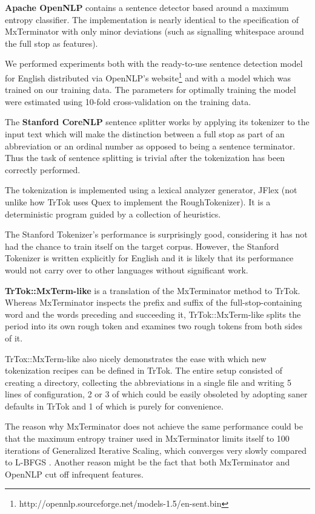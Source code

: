 \textbf{Apache OpenNLP} contains a sentence detector based around a
maximum entropy classifier. The implementation is nearly identical to
the specification of MxTerminator with only minor deviations (such as
signalling whitespace around the full stop as features).

We performed experiments both with the ready-to-use sentence detection
model for English distributed via OpenNLP's
website\footnote{http://opennlp.sourceforge.net/models-1.5/en-sent.bin}
and with a model which was trained on our training data. The
parameters for optimally training the model were estimated using
10-fold cross-validation on the training data.

The \textbf{Stanford CoreNLP} sentence splitter works by applying its
tokenizer to the input text which will make the distinction between a
full stop as part of an abbreviation or an ordinal number as opposed
to being a sentence terminator. Thus the task of sentence splitting is
trivial after the tokenization has been correctly performed.

The tokenization is implemented using a lexical analyzer generator,
JFlex (not unlike how TrTok uses Quex to implement the
RoughTokenizer). It is a deterministic program guided by a collection
of heuristics.

The Stanford Tokenizer's performance is surprisingly good, considering
it has not had the chance to train itself on the target corpus.
However, the Stanford Tokenizer is written explicitly for English and
it is likely that its performance would not carry over to other
languages without significant work.

\textbf{TrTok::MxTerm-like} is a translation of the MxTerminator
method to TrTok. Whereas MxTerminator inspects the prefix and suffix
of the full-stop-containing word and the words preceding and
succeeding it, TrTok::MxTerm-like splits the period into its own rough
token and examines two rough tokens from both sides of it.

TrTox::MxTerm-like also nicely demonstrates the ease with which new
tokenization recipes can be defined in TrTok. The entire setup
consisted of creating a directory, collecting the abbreviations in a
single file and writing 5 lines of configuration, 2 or 3 of which
could be easily obsoleted by adopting saner defaults in TrTok and 1 of
which is purely for convenience.

The reason why MxTerminator does not achieve the same performance
could be that the maximum entropy trainer used in MxTerminator limits
itself to 100 iterations of Generalized Iterative Scaling, which
converges very slowly compared to L-BFGS \cite{maxent-algorithms}.
Another reason might be the fact that both MxTerminator and OpenNLP
cut off infrequent features.

